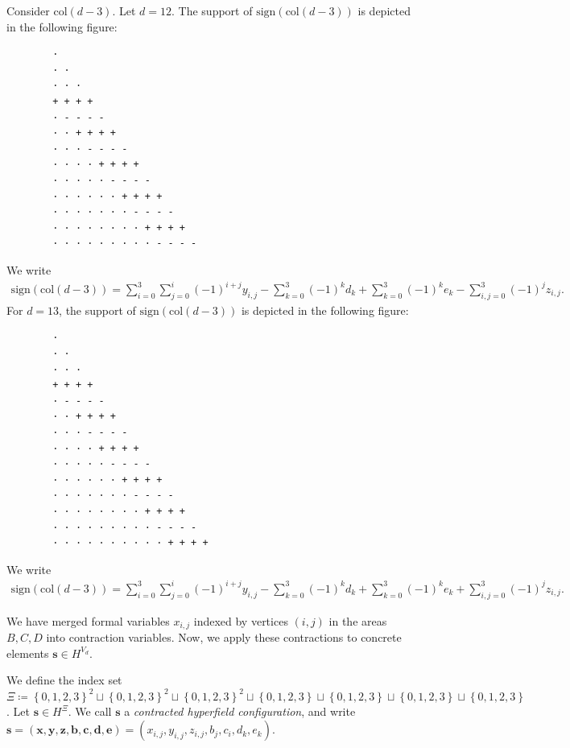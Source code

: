 \begin{example}
    Consider \( \mathrm{col}(d-3) \). Let \( d = 12 \). The support of \( \mathrm{sign}(\mathrm{col}(d-3)) \) is depicted in the following figure:
    \begin{verbatim}
        · 
        · · 
        · · · 
        + + + + 
        · - - - - 
        · · + + + + 
        · · · - - - - 
        · · · · + + + + 
        · · · · · - - - - 
        · · · · · · + + + + 
        · · · · · · · - - - - 
        · · · · · · · · + + + + 
        · · · · · · · · · - - - -
    \end{verbatim}
    We write 
    \begin{align*}
        \mathrm{sign}(\mathrm{col}(d-3)) = \sum^3_{i=0}\sum^i_{j=0} (-1)^{i+j}y_{i,j} - \sum^3_{k=0}(-1)^{k}d_k  + \sum^3_{k=0}(-1)^{k}e_k - \sum^3_{i,j=0}(-1)^{j}z_{i,j}.
    \end{align*}
    For \( d = 13 \), the support of \( \mathrm{sign}(\mathrm{col}(d-3)) \) is depicted in the following figure:
    \begin{verbatim}
        · 
        · · 
        · · · 
        + + + + 
        · - - - - 
        · · + + + + 
        · · · - - - - 
        · · · · + + + + 
        · · · · · - - - - 
        · · · · · · + + + + 
        · · · · · · · - - - - 
        · · · · · · · · + + + + 
        · · · · · · · · · - - - -
        · · · · · · · · · · + + + +
    \end{verbatim}
    We write 
    \begin{align*}
        \mathrm{sign}(\mathrm{col}(d-3)) = \sum^3_{i=0}\sum^i_{j=0} (-1)^{i+j}y_{i,j} - \sum^3_{k=0}(-1)^{k}d_k  + \sum^3_{k=0}(-1)^{k}e_k + \sum^3_{i,j=0}(-1)^{j}z_{i,j}.
    \end{align*}
\end{example}

We have merged formal variables \( x_{i,j} \) indexed by vertices \( (i,j) \) in the areas \( B, C, D \) into contraction variables. Now, we apply these contractions to concrete elements \( \mathbf{s} \in H^{V_d} \).

\begin{definition}
    We define the index set \(  \Xi \coloneqq \left\{ 0,1,2,3 \right\}^2 \sqcup \left\{ 0,1,2,3 \right\}^2 \sqcup \left\{ 0,1,2,3 \right\}^2 \sqcup \left\{ 0,1,2,3 \right\} \sqcup \left\{ 0,1,2,3 \right\} \sqcup \left\{ 0,1,2,3 \right\} \sqcup \left\{ 0,1,2,3 \right\} \).
    Let \( \mathbf{s} \in H^{\Xi} \). We call \( \mathbf{s} \) a \emph{contracted hyperfield configuration}, and write \( \mathbf{s} = (\mathbf{x}, \mathbf{y}, \mathbf{z}, \mathbf{b}, \mathbf{c}, \mathbf{d}, \mathbf{e}) = (x_{i,j}, y_{i,j}, z_{i,j}, b_j, c_i, d_k, e_k) \).
\end{definition}

